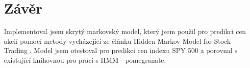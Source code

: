 \section{Závěr}

Implementoval jsem skrytý markovský model, který jsem použil pro predikci cen akcií pomocí metody vycházející ze článku Hidden Markov Model for Stock Trading \cite{Nguyen}. Model jsem otestoval pro predikci cen indexu SPY 500 a porovnal s existující knihovnou pro práci s HMM - pomegranate.

\clearpage
